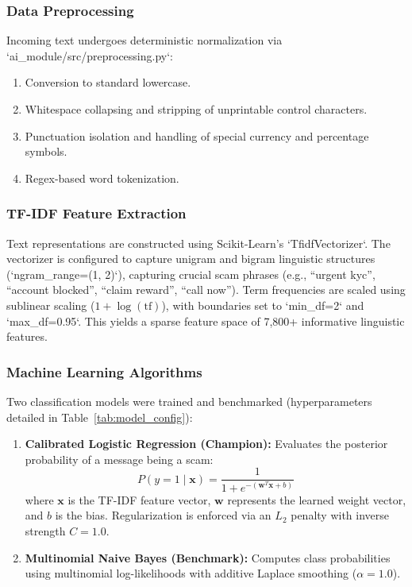 \documentclass[conference]{IEEEtran}
\begin{document}
\subsubsection{Data Preprocessing}
Incoming text undergoes deterministic normalization via `ai_module/src/preprocessing.py`:
\begin{enumerate}
    \item Conversion to standard lowercase.
    \item Whitespace collapsing and stripping of unprintable control characters.
    \item Punctuation isolation and handling of special currency and percentage symbols.
    \item Regex-based word tokenization.
\end{enumerate}

\subsubsection{TF-IDF Feature Extraction}
Text representations are constructed using Scikit-Learn's `TfidfVectorizer`. The vectorizer is configured to capture unigram and bigram linguistic structures (`ngram_range=(1, 2)`), capturing crucial scam phrases (e.g., ``urgent kyc'', ``account blocked'', ``claim reward'', ``call now''). Term frequencies are scaled using sublinear scaling ($1 + \log(\text{tf})$), with boundaries set to `min_df=2` and `max_df=0.95`. This yields a sparse feature space of 7,800+ informative linguistic features.

\subsubsection{Machine Learning Algorithms}
Two classification models were trained and benchmarked (hyperparameters detailed in Table~\ref{tab:model_config}):
\begin{enumerate}
    \item \textbf{Calibrated Logistic Regression (Champion):} Evaluates the posterior probability of a message being a scam:
    \begin{equation}
        P(y = 1 \mid \mathbf{x}) = \frac{1}{1 + e^{-(\mathbf{w}^T \mathbf{x} + b)}}
    \end{equation}
    where $\mathbf{x}$ is the TF-IDF feature vector, $\mathbf{w}$ represents the learned weight vector, and $b$ is the bias. Regularization is enforced via an $L_2$ penalty with inverse strength $C = 1.0$.
    \item \textbf{Multinomial Naive Bayes (Benchmark):} Computes class probabilities using multinomial log-likelihoods with additive Laplace smoothing ($\alpha = 1.0$).
\end{enumerate}
\end{document}
